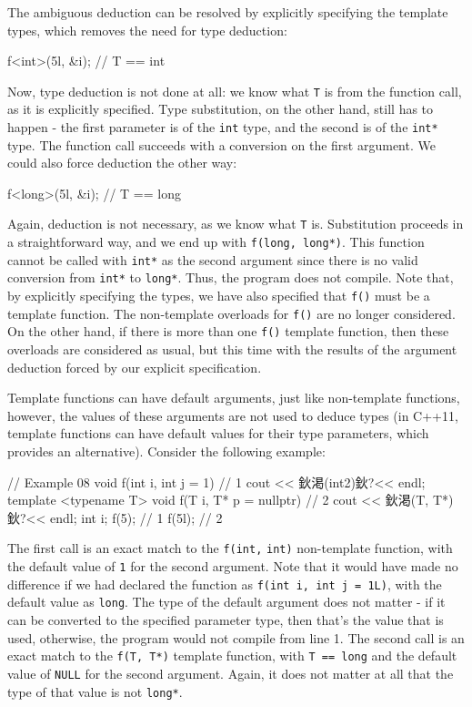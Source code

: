 The ambiguous deduction can be resolved by explicitly specifying the template types, which removes the need for type deduction:

\begin{code}
f<int>(5l, &i);    // T == int
\end{code}

Now, type deduction is not done at all: we know what \texttt{T} is from the function call, as it is explicitly specified. Type substitution, on the other hand, still has to happen - the first parameter is of the \texttt{int} type, and the second is of the \texttt{int*} type. The function call succeeds with a conversion on the first argument. We could also force deduction the other way:

\begin{code}
f<long>(5l, &i);    // T == long
\end{code}

Again, deduction is not necessary, as we know what \texttt{T} is. Substitution proceeds in a straightforward way, and we end up with \texttt{f(long,\ long*)}. This function cannot be called with \texttt{int*} as the second argument since there is no valid conversion from \texttt{int*} to \texttt{long*}. Thus, the program does not compile. Note that, by explicitly specifying the types, we have also specified that \texttt{f()} must be a template function. The non-template overloads for \texttt{f()} are no longer considered. On the other hand, if there is more than one \texttt{f()} template function, then these overloads are considered as usual, but this time with the results of the argument deduction forced by our explicit specification.

Template functions can have default arguments, just like non-template functions, however, the values of these arguments are not used to deduce types (in C++11, template functions can have default values for their type parameters, which provides an alternative). Consider the following example:

\begin{code}
// Example 08
void f(int i, int j = 1) {                      // 1
  cout << 鈥渇(int2)鈥?<< endl;
}
template <typename T> void f(T i, T* p = nullptr) {    // 2
  cout << 鈥渇(T, T*)鈥?<< endl;
}
int i;
f(5);        // 1
f(5l);    // 2
\end{code}

The first call is an exact match to the \texttt{f(int,} \texttt{int)} non-template function, with the default value of \texttt{1} for the second argument. Note that it would have made no difference if we had declared the function as \texttt{f(int\ i,\ int\ j\ =\ 1L)}, with the default value as \texttt{long}. The type of the default argument does not matter - if it can be converted to the specified parameter type, then that's the value that is used, otherwise, the program would not compile from line 1. The second call is an exact match to the \texttt{f(T,\ T*)} template function, with \texttt{T\ ==\ long} and the default value of \texttt{NULL} for the second argument. Again, it does not matter at all that the type of that value is not \texttt{long*}.

